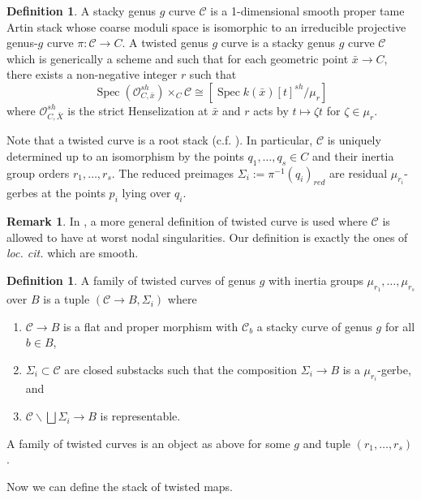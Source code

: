 \documentclass[a4paper,12pt]{amsart}
\theoremstyle{definition}
\newtheorem{defn}[thm]{Definition}
\newtheorem{rmk}[thm]{Remark}
\newcommand{\cO}{\mathcal{O}}
\newcommand{\cC}{\mathcal{C}}
\newcommand{\Cc}{\mathcal{C}}
\DeclareMathOperator{\Spec}{Spec}
\renewcommand{\setminus}{\smallsetminus}
\begin{document}
	\begin{defn}\label{def:spcurve} A stacky genus $g$ curve $\Cc$ is a 1-dimensional smooth proper tame Artin stack whose coarse moduli space is isomorphic to an irreducible projective genus-$g$ curve $\pi : \Cc \to C$. A twisted genus $g$ curve is a stacky genus $g$ curve $\Cc$ which is generically a scheme and such that for each geometric point $\bar{x} \to C$, there exists a non-negative integer $r$ such that
		$$
		\Spec (\cO_{C,\bar{x}}^{sh}) \times_C \Cc \cong \left[ \Spec k(\bar{x})[t]^{sh} / \mu_r\right]
		$$
		where $\cO_{C,\bar{X}}^{sh}$ is the strict Henselization at $\bar{x}$ and $r$ acts by $t \mapsto \zeta t$ for $\zeta \in \mu_r$. 
	\end{defn}
	
	\par Note that a twisted curve is a root stack (c.f. \cite[\S 10.3]{Olsson2}). In particular, $\Cc$ is uniquely determined up to an isomorphism by the points $q_1,\dotsc,q_s \in C$ and their inertia group orders $r_1,\dotsc,r_s$. The reduced preimages $\Sigma_i := \pi^{-1}(q_i)_{red}$ are residual $\mu_{r_i}$-gerbes at the points $p_i$ lying over $q_i$. 
	
	\begin{rmk} In \cite{AOV2}, a more general definition of twisted curve is used where $\cC$ is allowed to have at worst nodal singularities. Our definition is exactly the ones of \emph{loc. cit.} which are smooth. 
	\end{rmk}
	
	
	\begin{defn} A family of twisted curves of genus $g$ with inertia groups $\mu_{r_1}, \ldots, \mu_{r_s}$ over $B$ is a tuple $(\Cc \to B, \Sigma_i)$ where
		\begin{enumerate}
			\item $\Cc \to B$ is a flat and proper morphism with $\Cc_b$ a stacky curve of genus $g$ for all $b \in B$, 
			\item $\Sigma_i \subset \Cc$ are closed substacks such that the composition $\Sigma_i \to B$ is a $\mu_{r_i}$-gerbe, and
			\item $\Cc \setminus \bigsqcup \Sigma_i \to B$ is representable. 
		\end{enumerate}
		A family of twisted curves is an object as above for some $g$ and tuple $(r_1, \ldots, r_s)$. 
	\end{defn}
	
	Now we can define the stack of twisted maps. 
	
\end{document}
